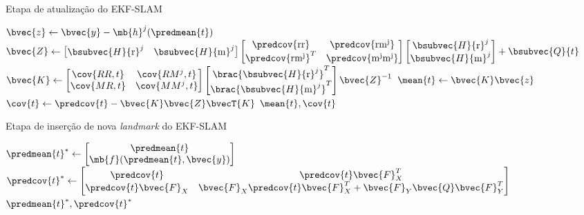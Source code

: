 \begin{algorithm}[h]
  \caption{Etapa de atualização do EKF-SLAM}
  \label{alg:ekf-slam-update}
\begin{algorithmic}[1]
  \State $\bvec{z} \gets \bvec{y} - \mb{h}^j(\predmean{t})$
  \State $\bvec{Z} \gets \begin{bmatrix}
    \bsubvec{H}{\mathrm{r}}^j & \bsubvec{H}{\mathrm{m}}^j
  \end{bmatrix}
  \begin{bmatrix}
    \predcov{\mathrm{rr}} & \predcov{\mathrm{rm^j}} \\
    \predcov{\mathrm{rm^j}}^T & \predcov{\mathrm{m^j m^j}}
  \end{bmatrix}
  \begin{bmatrix}
    \bsubvec{H}{\mathrm{r}}^j \\ \bsubvec{H}{\mathrm{m}}^j
  \end{bmatrix} + \bsubvec{Q}{t}$
  \State $\bvec{K} \gets \begin{bmatrix} \cov{RR, t} & \cov{RM^j, t} \\ 
    \cov{MR, t} & \cov{MM^j, t} 
  \end{bmatrix}
  \begin{bmatrix}
    \brac{\bsubvec{H}{\mathrm{r}}^j}^T \\ \brac{\bsubvec{H}{\mathrm{m}}^j}^T
  \end{bmatrix} \bvec{Z}^{-1}$
  \State $\mean{t} \gets \bvec{K} \bvec{z}$
  \State $\cov{t} \gets \predcov{t} - \bvec{K}\bvec{Z}\bvecT{K}$
  \State \Return $\mean{t}, \cov{t}$
  \EndProcedure
\end{algorithmic}
\end{algorithm}

\begin{algorithm}[h]
  \caption{Etapa de inserção de nova \textit{landmark} do EKF-SLAM}
  \label{alg:ekf-slam-landmark-insertion}
\begin{algorithmic}[1]
    \State $\predmean{t}^* \gets \begin{bmatrix}
      \predmean{t} \\ \mb{f}(\predmean{t}, \bvec{y})
    \end{bmatrix}$
    \State $\predcov{t}^* \gets \begin{bmatrix}
      \predcov{t} & \predcov{t} \bvec{F}_X^T\\
       \predcov{t} \bvec{F}_X &  \bvec{F}_X \predcov{t} \bvec{F}_X^T 
       + \bvec{F}_Y \bvec{Q} \bvec{F}_Y^T
    \end{bmatrix}$
    \State \Return $\predmean{t}^*, \predcov{t}^*$
  \EndProcedure
\end{algorithmic}
\end{algorithm}

